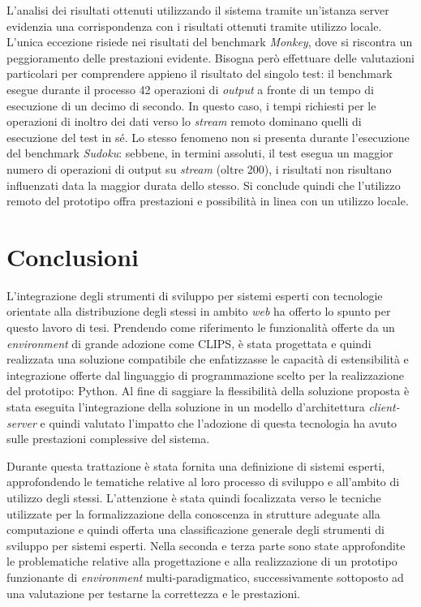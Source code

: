 L'analisi dei risultati ottenuti utilizzando il sistema tramite un'istanza server evidenzia una corrispondenza con i risultati ottenuti tramite utilizzo locale. L'unica eccezione risiede nei risultati del benchmark \emph{Monkey}, dove si riscontra un peggioramento delle prestazioni evidente. Bisogna però effettuare delle valutazioni particolari per comprendere appieno il risultato del singolo test: il benchmark esegue durante il processo 42 operazioni di \emph{output} a fronte di un tempo di esecuzione di un decimo di secondo. In questo caso, i tempi richiesti per le operazioni di inoltro dei dati verso lo \emph{stream} remoto dominano quelli di esecuzione del test in sé. Lo stesso fenomeno non si presenta durante l'esecuzione del benchmark \emph{Sudoku}: sebbene, in termini assoluti, il test esegua un maggior numero di operazioni di output su \emph{stream} (oltre 200), i risultati non risultano influenzati data la maggior durata dello stesso. Si conclude quindi che l'utilizzo remoto del prototipo offra prestazioni e possibilità in linea con un utilizzo locale.

\section{Conclusioni}

L'integrazione degli strumenti di sviluppo per sistemi esperti con tecnologie orientate alla distribuzione degli stessi in ambito \emph{web} ha offerto lo spunto per questo lavoro di tesi. Prendendo come riferimento le funzionalità offerte da un \emph{environment} di grande adozione come CLIPS, è stata progettata e quindi realizzata una soluzione compatibile che enfatizzasse le capacità di estensibilità e integrazione offerte dal linguaggio di programmazione scelto per la realizzazione del prototipo: Python. Al fine di saggiare la flessibilità della soluzione proposta è stata eseguita l'integrazione della soluzione in un modello d'architettura \emph{client-server} e quindi valutato l'impatto che l'adozione di questa tecnologia ha avuto sulle prestazioni complessive del sistema.

Durante questa trattazione è stata fornita una definizione di sistemi esperti, approfondendo le tematiche relative al loro processo di sviluppo e all'ambito di utilizzo degli stessi. L'attenzione è stata quindi focalizzata verso le tecniche utilizzate per la formalizzazione della conoscenza in strutture adeguate alla computazione e quindi offerta una classificazione generale degli strumenti di sviluppo per sistemi esperti.
Nella seconda e terza parte sono state approfondite le problematiche relative alla progettazione e alla realizzazione di un prototipo funzionante di \emph{environment} multi-paradigmatico, successivamente sottoposto ad una valutazione per testarne la correttezza e le prestazioni.

